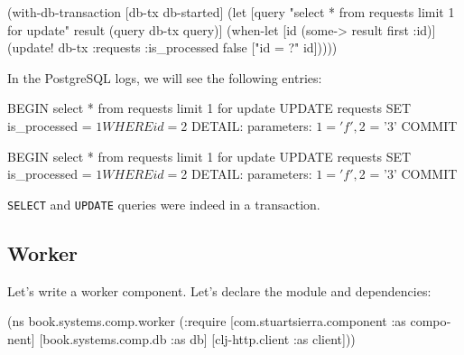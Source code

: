 \else

\begin{english}
  \begin{clojure}
(with-db-transaction
  [db-tx db-started]
  (let [query "select * from requests limit 1 for update"
        result (query db-tx query)]
    (when-let [id (some-> result first :id)]
      (update! db-tx :requests
               {:is_processed false}
               ["id = ?" id]))))
  \end{clojure}
\end{english}

\fi

\noindent
In the PostgreSQL logs, we will see the following entries:


\ifnarrow

\begin{english}
  \begin{sql}
BEGIN
select * from requests
limit 1 for update
UPDATE requests SET is_processed = $1
WHERE id = $2
DETAIL:  parameters: $1 = 'f', $2 = '3'
COMMIT
  \end{sql}
\end{english}

\else

\begin{english}
  \begin{sql}
BEGIN
select * from requests limit 1 for update
UPDATE requests SET is_processed = $1 WHERE id = $2
DETAIL:  parameters: $1 = 'f', $2 = '3'
COMMIT
  \end{sql}
\end{english}

\fi

\noindent
\verb|SELECT| and \verb|UPDATE| queries were indeed in a transaction.

\subsection{Worker}

Let's write a worker component. Let's declare the module and dependencies:

\ifnarrow

\begin{english}
  \begin{clojure}
(ns book.systems.comp.worker
  (:require
   [com.stuartsierra.component
    :as component]
   [book.systems.comp.db :as db]
   [clj-http.client :as client]))
  \end{clojure}
\end{english}

